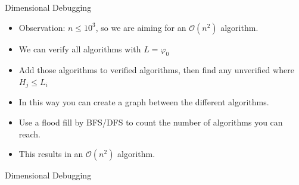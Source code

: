 \documentclass[11pt,pdf, aspectratio=169]{beamer}
\begin{document}
  \begin{frame}{Dimensional Debugging}
    \begin{itemize}
      \item<+-> Observation: $n \leq 10^3$, so we are aiming for an $\mathcal{O}(n^2)$ algorithm.
      \item<+-> We can verify all algorithms with $L = \varphi_0$
      \item<+-> Add those algorithms to verified algorithms, then find any unverified where $H_j \leq L_i$
      \item<+-> In this way you can create a graph between the different algorithms.
      \item<+-> Use a flood fill by BFS/DFS to count the number of algorithms you can reach.
      \item<+-> This results in an $\mathcal{O}(n^2)$ algorithm.
    \end{itemize}
  \end{frame}
  \begin{frame}[containsverbatim]{Dimensional Debugging}
    \inputminted[fontsize=\tiny]{python}{code/session-1/python/dapc-d.py}
  \end{frame}
\end{document}
